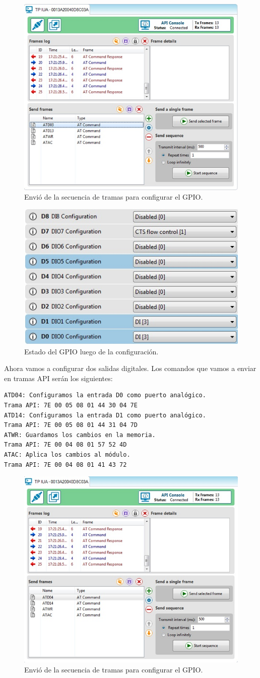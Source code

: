 \documentclass[11pt,oneside,spanish,a4paper]{article}
\begin{document}
\begin{figure}[h]
	\centering
	\includegraphics[width=.6\textwidth]{img/IMAGEN18.jpg}
	\caption{Envió de la secuencia de tramas para configurar el GPIO.}
\end{figure}
\begin{figure}[h]
	\centering
	\includegraphics[width=.6\textwidth]{img/IMAGEN19.jpg}
	\caption{Estado del GPIO luego de la configuración.}
\end{figure}
Ahora vamos a configurar dos salidas digitales.
Los comandos que vamos a enviar en tramas API serán los siguientes:
\begin{lstlisting}[emph={ATD04: ,Trama API:,ATD14:,ATWR:,ATAC:}, emphstyle={\color{green}}, label=code:apiEjempl-id]
ATD04: Configuramos la entrada D0 como puerto analógico.
Trama API: 7E 00 05 08 01 44 30 04 7E
ATD14: Configuramos la entrada D1 como puerto analógico.
Trama API: 7E 00 05 08 01 44 31 04 7D
ATWR: Guardamos los cambios en la memoria.
Trama API: 7E 00 04 08 01 57 52 4D
ATAC: Aplica los cambios al módulo.
Trama API: 7E 00 04 08 01 41 43 72
\end{lstlisting} 
\begin{figure}[h]
	\centering
	\includegraphics[width=.6\textwidth]{img/IMAGEN20.jpg}
	\caption{Envió de la secuencia de tramas para configurar el GPIO.}
\end{figure}
\end{document}

